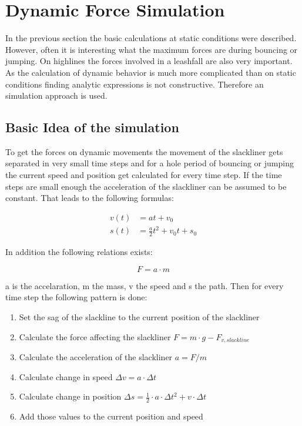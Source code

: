 \chapter{Dynamic Force Simulation}

In the previous section the basic calculations at static conditions were described. However, often it is interesting what the maximum forces are during bouncing or jumping. On highlines the forces involved in a leashfall are also very important. As the calculation of dynamic behavior is much more complicated than on static conditions finding analytic expressions is not constructive. Therefore an simulation approach is used.


\section{Basic Idea of the simulation}
To get the forces on dynamic movements the movement of the slackliner gets separated in very small time steps and for a hole period of bouncing or jumping the current speed and position get calculated for every time step. If the time steps are small enough the acceleration of the slackliner can be assumed to be constant. That leads to the following formulas:

\begin{align}
	v(t) &= at+v_0 \\
	s(t) &= \frac{a}{2}t^2 + v_0 t + s_0
\end{align}

In addition the following relations exists:

\begin{equation}
	F = a\cdot m
\end{equation}

a is the accelaration, m the mass, v the speed and s the path. Then for every time step the following pattern is done:

\begin{enumerate}
	\item Set the sag of the slackline to the current position of  the slackliner
	\item Calculate the force affecting the slackliner $F = m\cdot g - F_{v,slackline}$
	\item Calculate the acceleration of the slackliner $a = F / m$
	\item Calculate change in speed $\Delta v = a\cdot\Delta t$
	\item Calculate change in position $\Delta s = \frac{1}{2}\cdot a\cdot\Delta t^2 + v\cdot\Delta t$
	\item Add those values to the current position and speed
\end{enumerate}

